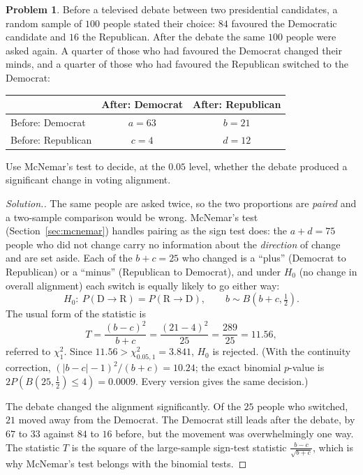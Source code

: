 \documentclass[11pt,a4paper]{article}
\theoremstyle{definition}
\newtheorem{problemx}{Problem}[section]
\newenvironment{problem}{\begin{problemx}}{\end{problemx}}
\newenvironment{solution}
  {\renewcommand{\qedsymbol}{}\begin{proof}[\textit{Solution}.]}
  {\end{proof}}
\begin{document}
\begin{problem}
Before a televised debate between two presidential candidates, a random sample of
$100$ people stated their choice: $84$ favoured the Democratic candidate and $16$ the
Republican. After the debate the same $100$ people were asked again. A quarter of those
who had favoured the Democrat changed their minds, and a quarter of those who had
favoured the Republican switched to the Democrat:
\begin{center}
\begin{tabular}{l|cc}
 & After: Democrat & After: Republican\\\hline
Before: Democrat & $a = 63$ & $b = 21$\\
Before: Republican & $c = 4$ & $d = 12$
\end{tabular}
\end{center}
Use McNemar's test to decide, at the $0.05$ level, whether the debate produced a
significant change in voting alignment.
\end{problem}

\begin{solution}
The same people are asked twice, so the two proportions are \emph{paired} and a
two-sample comparison would be wrong. McNemar's test
(Section~\ref{sec:mcnemar}) handles pairing as the sign test does: the $a+d = 75$ people who did not change carry no information about the
\emph{direction} of change and are set aside. Each of the $b+c = 25$ who changed is a
``plus'' (Democrat to Republican) or a ``minus'' (Republican to Democrat), and under
$H_0$ (no change in overall alignment) each switch is equally likely to go either way:
\[H_0:\ P(\text{D}\to\text{R}) = P(\text{R}\to\text{D}),\qquad b\sim B\left(b+c,\tfrac12\right).\]
The usual form of the statistic is
\[T = \frac{(b-c)^{2}}{b+c} = \frac{(21-4)^{2}}{25} = \frac{289}{25} = 11.56,\]
referred to $\chi^{2}_{1}$. Since $11.56 > \chi^{2}_{0.05,1} = 3.841$, $H_0$ is rejected.
(With the continuity correction, $(|b-c|-1)^{2}/(b+c) = 10.24$; the exact binomial
$p$-value is $2P\left(B(25,\frac12)\leq 4\right) = 0.0009$. Every version gives the same
decision.)

The debate changed the alignment significantly. Of the $25$ people who switched, $21$
moved away from the Democrat. The Democrat still leads after the debate, by $67$ to $33$
against $84$ to $16$ before, but the movement was overwhelmingly one way. The statistic
$T$ is the square of the large-sample sign-test statistic $\frac{b-c}{\sqrt{b+c}}$, which
is why McNemar's test belongs with the binomial tests.
\end{solution}
\end{document}
